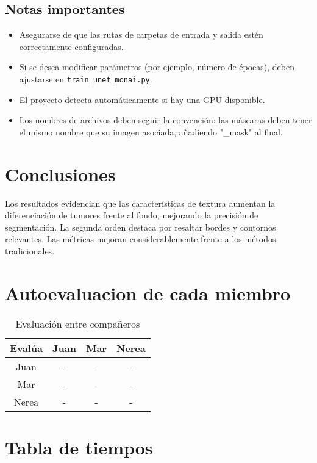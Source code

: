 \documentclass[12pt]{article}
\begin{document}
\subsection{Notas importantes}

\begin{itemize}
    \item Asegurarse de que las rutas de carpetas de entrada y salida estén correctamente configuradas.
    \item Si se desea modificar parámetros (por ejemplo, número de épocas), deben ajustarse en \texttt{train\_unet\_monai.py}.
    \item El proyecto detecta automáticamente si hay una GPU disponible.
    \item Los nombres de archivos deben seguir la convención: las máscaras deben tener el mismo nombre que su imagen asociada, añadiendo "\_mask" al final.
\end{itemize}


\section{Conclusiones}
Los resultados evidencian que las características de textura aumentan la diferenciación de tumores frente al fondo, mejorando la precisión de segmentación. La segunda orden destaca por resaltar bordes y contornos relevantes. Las métricas mejoran considerablemente frente a los métodos tradicionales.

\section{Autoevaluacion de cada miembro}

\begin{table}[H]
\centering
\begin{tabular}{|c|c|c|c|}
\hline
\textbf{Evalúa} & \textbf{Juan} & \textbf{Mar} & \textbf{Nerea} \\
\hline
Juan & - & - & - \\
Mar & - & - & - \\
Nerea & - & - & - \\
\hline
\end{tabular}
\caption{Evaluación entre compañeros}
\end{table}

\section{Tabla de tiempos}
\end{document}
